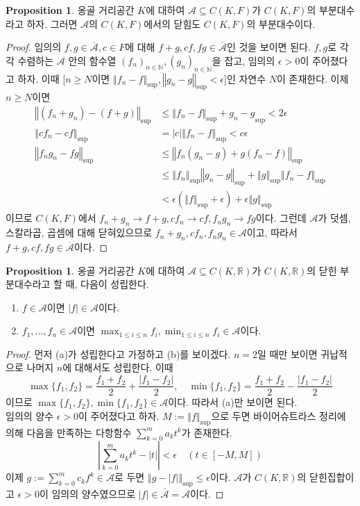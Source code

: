 \documentclass[11pt]{book}
\numberwithin{equation}{chapter}
\def\NN{\mathbb{N}}
\def\RR{\mathbb{R}}
\def\eps{\epsilon}
\def\calA{\mathcal{A}}
\newcommand{\abs}[1]{\left\vert#1\right\vert}
\newcommand{\norm}[1]{\left\Vert#1\right\Vert}
\theoremstyle{definition}
\newtheorem{prop}[thm]{Proposition}
\newenvironment{enum}
	{\begin{enumerate}[label=(\alph*), leftmargin=2\parindent]}
	{\end{enumerate}}
\begin{document}
\begin{prop}
    옹골 거리공간 \(K\)에 대하여 \(\calA \subseteq C(K, F)\)가 \(C(K, F)\)의 부분대수라고 하자. 그러면 \(\calA\)의 \(C(K, F)\)에서의 닫힘도 \(C(K, F)\)의 부분대수이다.
\end{prop}
\begin{proof}
    임의의 \(f, g \in \overline{\calA}, c \in F\)에 대해 \(f+g, cf, fg \in \overline{\calA}\)인 것을 보이면 된다. \(f, g\)로 각각 수렴하는 \(\calA\) 안의 함수열 \((f_n)_{n \in \NN}, (g_n)_{n \in \NN}\)을 잡고, 임의의 \(\eps > 0\)이 주어졌다고 하자. 이때 [\(n \ge N\)이면 \(\norm{f_n - f}_{\sup}, \norm{g_n - g}_{\sup} < \eps\)]인 자연수 \(N\)이 존재한다. 이제 \(n \ge N\)이면
    \begin{align*}
        \norm{(f_n + g_n) - (f + g)}_{\sup} &\le \norm{f_n - f}_{\sup} + {g_n - g}_{\sup} < 2\eps\\
        \norm{cf_n - cf}_{\sup} &= \abs{c}\norm{f_n - f}_{\sup} < c\eps\\
        \norm{f_n g_n - fg}_{\sup} &\le \norm{f_n(g_n - g) + g(f_n - f)}_{\sup}\\
        &\le \norm{f_n}_{\sup} \norm{g_n - g}_{\sup} + \norm{g}_{\sup}\norm{f_n - f}_{\sup}\\
        &< \eps(\norm{f}_{\sup} + \eps) + \eps \norm{g}_{\sup}
    \end{align*}
    이므로 \(C(K, F)\)에서 \(f_n + g_n \to f + g, cf_n \to cf, f_n g_n \to fg\)이다. 그런데 \(\calA\)가 덧셈, 스칼라곱, 곱셈에 대해 닫혀있으므로 \(f_n + g_n, cf_n, f_n g_n \in \calA\)이고, 따라서 \(f+g, cf, fg \in \overline{\calA}\)이다.
\end{proof}

\begin{prop} \label{10.3.6}
    옹골 거리공간 \(K\)에 대하여 \(\calA \subseteq C(K, \RR)\)가 \(C(K, \RR)\)의 닫힌 부분대수라고 할 때, 다음이 성립한다.
    \begin{enum}
        \item \(f \in \calA\)이면 \(\abs{f} \in \calA\)이다.
        \item \(f_1, \ldots, f_n \in \calA\)이면 \(\max_{1 \le i \le n} f_i, \min_{1 \le i \le n} f_i \in \calA\)이다.
    \end{enum}
\end{prop}
\begin{proof}
    먼저 (a)가 성립한다고 가정하고 (b)를 보이겠다. \(n = 2\)일 때만 보이면 귀납적으로 나머지 \(n\)에 대해서도 성립한다. 이때
    \[
    \max\{f_1, f_2\} = \frac{f_1 + f_2}{2} + \frac{\abs{f_1 - f_2}}{2}, \quad \min\{f_1, f_2\} = \frac{f_1 + f_2}{2} - \frac{\abs{f_1 - f_2}}{2}    
    \]
    이므로 \(\max\{f_1, f_2\}, \min\{f_1, f_2\} \in \calA\)이다. 따라서 (a)만 보이면 된다.\\
    임의의 양수 \(\eps > 0\)이 주어졌다고 하자. \(M := \norm{f}_{\sup}\)으로 두면 바이어슈트라스 정리에 의해 다음을 만족하는 다항함수 \(\sum_{k=0}^m a_k t^k\)가 존재한다.
    \[
        \abs{\sum_{k=0}^m a_k t^k - \abs{t}} < \eps \quad (t \in [-M, M])    
    \]
    이제 \(g := \sum_{k=0}^m c_k f^k \in \calA\)로 두면 \(\norm{g - \abs{f}}_{\sup} \le \eps\)이다. \(\calA\)가 \(C(K, \RR)\)의 닫힌집합이고 \(\eps > 0\)이 임의의 양수였으므로 \(\abs{f} \in \overline{\calA} = \calA\)이다.
\end{proof}
\end{document}
